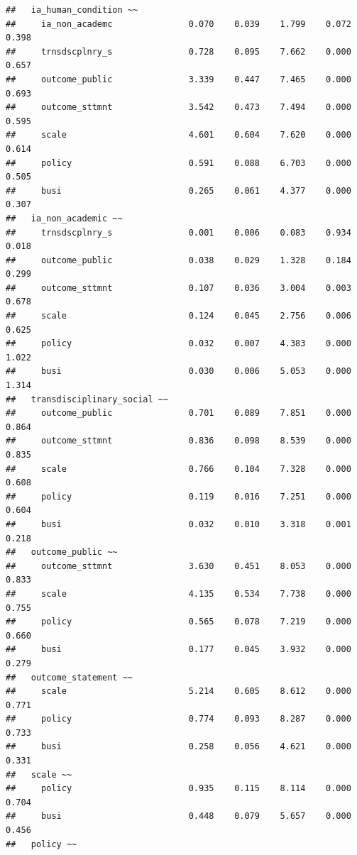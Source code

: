 \documentclass[
]{article}
\begin{document}
\begin{verbatim}
##   ia_human_condition ~~                                                   
##     ia_non_academc               0.070    0.039    1.799    0.072    0.398
##     trnsdscplnry_s               0.728    0.095    7.662    0.000    0.657
##     outcome_public               3.339    0.447    7.465    0.000    0.693
##     outcome_sttmnt               3.542    0.473    7.494    0.000    0.595
##     scale                        4.601    0.604    7.620    0.000    0.614
##     policy                       0.591    0.088    6.703    0.000    0.505
##     busi                         0.265    0.061    4.377    0.000    0.307
##   ia_non_academic ~~                                                      
##     trnsdscplnry_s               0.001    0.006    0.083    0.934    0.018
##     outcome_public               0.038    0.029    1.328    0.184    0.299
##     outcome_sttmnt               0.107    0.036    3.004    0.003    0.678
##     scale                        0.124    0.045    2.756    0.006    0.625
##     policy                       0.032    0.007    4.383    0.000    1.022
##     busi                         0.030    0.006    5.053    0.000    1.314
##   transdisciplinary_social ~~                                             
##     outcome_public               0.701    0.089    7.851    0.000    0.864
##     outcome_sttmnt               0.836    0.098    8.539    0.000    0.835
##     scale                        0.766    0.104    7.328    0.000    0.608
##     policy                       0.119    0.016    7.251    0.000    0.604
##     busi                         0.032    0.010    3.318    0.001    0.218
##   outcome_public ~~                                                       
##     outcome_sttmnt               3.630    0.451    8.053    0.000    0.833
##     scale                        4.135    0.534    7.738    0.000    0.755
##     policy                       0.565    0.078    7.219    0.000    0.660
##     busi                         0.177    0.045    3.932    0.000    0.279
##   outcome_statement ~~                                                    
##     scale                        5.214    0.605    8.612    0.000    0.771
##     policy                       0.774    0.093    8.287    0.000    0.733
##     busi                         0.258    0.056    4.621    0.000    0.331
##   scale ~~                                                                
##     policy                       0.935    0.115    8.114    0.000    0.704
##     busi                         0.448    0.079    5.657    0.000    0.456
##   policy ~~                                                               

\end{verbatim}
\end{document}
